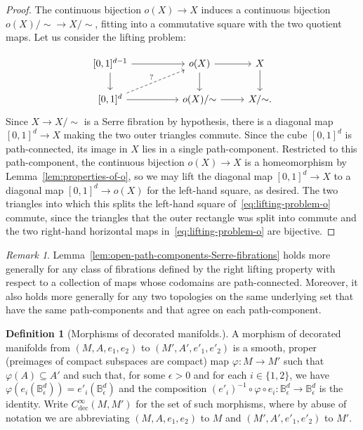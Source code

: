 \documentclass[10pt,a4paper]{amsart}
\numberwithin{equation}{section}
\newcommand{\rdec}{\mathrm{dec}}
\newcommand{\bB}{\mathbb{B}}
\theoremstyle{definition}
\newtheorem{defi}[theo]{Definition}
\theoremstyle{remark}
\newtheorem{rema}[theo]{Remark}
\begin{document}
\begin{proof}
The continuous bijection $o(X) \to X$ induces a continuous bijection $o(X)/{\sim} \to X/{\sim}$, fitting into a commutative square with the two quotient maps. Let us consider the lifting problem:


\begin{equation}\label{eq:lifting-problem-o}
\begin{tikzcd}
{[0,1]^{d-1}} \ar[rr] \ar[d] && o(X) \ar[d] \ar[r] & X \ar[d] \\
{[0,1]^d} \ar[rr] \ar[densely dashed,rru,"?"] && o(X)/{\sim} \ar[r] & X/{\sim}.
\end{tikzcd}
\end{equation}
Since $X \to X/{\sim}$ is a Serre fibration by hypothesis, there is a diagonal map $[0,1]^d \to X$ making the two outer triangles commute. Since the cube $[0,1]^d$ is path-connected, its image in $X$ lies in a single path-component. Restricted to this path-component, the continuous bijection $o(X) \to X$ is a homeomorphism by Lemma~\ref{lem:properties-of-o}, so we may lift the diagonal map $[0,1]^d \to X$ to a diagonal map $[0,1]^d \to o(X)$ for the left-hand square, as desired. The two triangles into which this splits the left-hand square of~\eqref{eq:lifting-problem-o} commute, since the triangles that the outer rectangle was split into commute and the two right-hand horizontal maps in~\eqref{eq:lifting-problem-o} are bijective.
\end{proof}

\begin{rema}
Lemma~\ref{lem:open-path-components-Serre-fibrations} holds more generally for any class of fibrations defined by the right lifting property with respect to a collection of maps whose codomains are path-connected. Moreover, it also holds more generally for any two topologies on the same underlying set that have the same path-components and that agree on each path-component.
\end{rema}


\setcounter{theo}{11}
\begin{defi}[Morphisms of decorated manifolds.]\label{def:decorated-manifolds-morphisms}
A morphism of decorated manifolds from $(M,A,e_{1},e_{2})$ to $(M',A',e'_{1},e'_{2})$ is a smooth, proper (preimages of compact subspaces are compact) map $\varphi \colon M \to M'$ such that $\varphi(A) \subseteq A'$ and such that, for some $\epsilon > 0$ and for each $i \in \{1,2\}$, we have $\varphi(e_{i}(\bB^d_\epsilon)) = e'_{i}(\bB^d_\epsilon)$ and the composition $(e'_{i})^{-1} \circ \varphi \circ e_{i} \colon \bB^d_\epsilon \rightarrow \bB^d_\epsilon$ is the identity. Write $C^\infty_{\rdec}(M,M')$ for the set of such morphisms, where by abuse of notation we are abbreviating $(M,A,e_{1},e_{2})$ to $M$ and $(M',A',e'_{1},e'_{2})$ to $M'$.
\end{defi}
\end{document}
